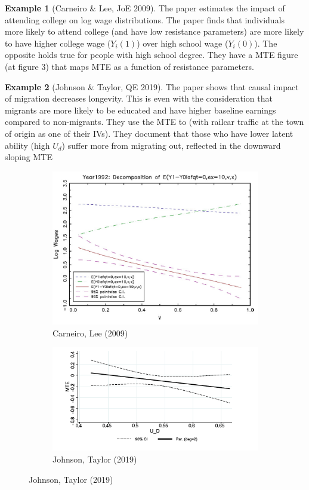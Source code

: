 \documentclass[12pt]{article}
\theoremstyle{definition}
\theoremstyle{property}
\theoremstyle{assumption}
\theoremstyle{example}
\newtheorem{example}{Example}[section]
\theoremstyle{comment}
\begin{document}
\begin{mdframed}[backgroundcolor=yellow!5] 
\begin{example}[Carneiro \& Lee, JoE 2009] The paper estimates the impact of attending college on log wage distributions. The paper finds that individuals more likely to attend college (and have low resistance parameters) are more likely to have higher college wage ($Y_i(1)$) over high school wage ($Y_i(0)$). The opposite holds true for people with high school degree. They have a MTE figure (at figure 3) that maps MTE as a function of resistance parameters.
\end{example}
\begin{example}[Johnson \& Taylor, QE 2019] The paper shows that causal impact of migration decreases longevity. This is even with the consideration that migrants are more likely to be educated and have higher baseline earnings compared to non-migrants. They use the MTE to (with railcar traffic at the town of origin as one of their IVs). They document that those who have lower latent ability (high $U_d$) suffer more from migrating out, reflected in the downward sloping MTE 
\end{example}
\centering
\begin{figure}[H]
\begin{subfigure}{0.5\textwidth}
\includegraphics[width=\textwidth]{fig11_1}
\caption{Carneiro, Lee (2009)}
\end{subfigure}
\begin{subfigure}{0.5\textwidth}
\includegraphics[width=\textwidth]{fig11_2}
\caption{Johnson, Taylor (2019)}
\end{subfigure}
\end{figure}
\end{mdframed}
\end{document}
